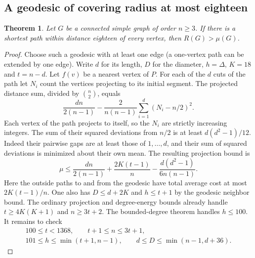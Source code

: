 \documentclass[11pt,a4paper]{article}
\newtheorem{theorem}{Theorem}[section]
\begin{document}
\subsection*{A geodesic of covering radius at most eighteen}
\begin{theorem}\label{p07-thm:widthplus}
Let $G$ be a connected simple graph of order $n\ge3$. If there is a
shortest path within distance eighteen of every vertex, then $R(G)>\mu(G)$.
\end{theorem}
\begin{proof}
Choose such a geodesic with at least one edge (a one-vertex path can be extended by one edge). Write $d$ for its length, $D$ for the diameter,
$h=\Delta$, $K=18$ and $t=n-d$. Let $f(v)$ be a nearest vertex of $P$.
For each of the $d$ cuts of the path let $N_i$ count the vertices
projecting to its initial segment. The projected distance sum, divided by
$\binom n2$, equals
\[
 \frac{dn}{2(n-1)}-\frac{2}{n(n-1)}\sum_{i=1}^d(N_i-n/2)^2.
\]
Each vertex of the path projects to itself, so the $N_i$ are strictly
increasing integers. The sum of their squared deviations from $n/2$ is
at least $d(d^2-1)/12$. Indeed their pairwise gaps are at least those
of $1,\ldots,d$, and their sum of squared deviations is minimized about
their own mean. The resulting projection bound is
\begin{equation}\label{p07-eq:widthplusproj}
 \mu\le \frac{dn}{2(n-1)}+\frac{2K(t-1)}n-
 \frac{d(d^2-1)}{6n(n-1)}.
\end{equation}
Here the outside paths to and from the geodesic have total average cost
at most $2K(t-1)/n$. One also has $D\le d+2K$ and $h\le t+1$ by the
geodesic neighbor bound. The ordinary projection and degree-energy
bounds already handle $t\ge4K(K+1)$ and $n\ge3t+2$. The bounded-degree
theorem handles $h\le100$. It remains to check
\begin{gather*}
 100\le t<1368,\qquad t+1\le n\le3t+1,\\
 101\le h\le\min(t+1,n-1),\qquad d\le D\le\min(n-1,d+36).
\end{gather*}


\end{proof}
\end{document}
